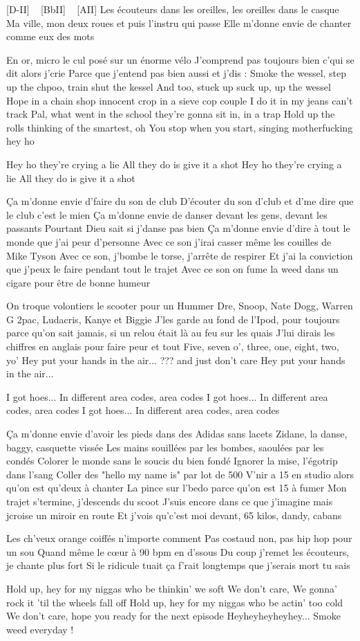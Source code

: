 [D-II] ~ [BbII] ~ [AII]
Les écouteurs dans les oreilles, les oreilles dans le casque
Ma ville, mon deux roues et puis l'instru qui passe
Elle m'donne envie de chanter comme eux des mots

En or, micro le cul posé sur un énorme vélo
J'comprend pas toujours bien c'qui se dit alors j'crie
Parce que j'entend pas bien aussi et j'dis :
Smoke the wessel, step up the chpoo, train shut the kessel
And too, stuck up suck up, up the wessel
Hope in a chain shop innocent crop in a sieve cop couple
I do it in my jeans can't track
Pal, what went in the school they're gonna sit in, in a trap
Hold up the rolls thinking of the smartest, oh
You stop when you start, singing motherfucking hey ho

Hey ho they're crying a lie
All they do is give it a shot
Hey ho they're crying a lie
All they do is give it a shot

Ça m'donne envie d'faire du son de club
D'écouter du son d'club et d'me dire que le club c'est le mien
Ça m'donne envie de danser devant les gens, devant les passants Pourtant Dieu sait si j'danse pas bien
Ça m'donne envie d'dire à tout le monde que j'ai peur d'personne
Avec ce son j'irai casser même les couilles de Mike Tyson
Avec ce son, j'bombe le torse, j'arrête de respirer
Et j'ai la conviction que j'peux le faire pendant tout le trajet
Avec ce son on fume la weed dans un cigare pour être de bonne humeur

On troque volontiers le scooter pour un Hummer
Dre, Snoop, Nate Dogg, Warren G
2pac, Ludacris, Kanye et Biggie
J'les garde au fond de l'Ipod, pour toujours parce qu'on sait jamais, si un relou était là au feu sur les quais
J'lui dirais les chiffres en anglais pour faire peur et tout
Five, seven o', three, one, eight, two, yo'
Hey put your hands in the air...
??? and just don't care
Hey put your hands in the air...


I got hoes...
In different area codes, area codes
I got hoes...
In different area codes, area codes
I got hoes...
In different area codes, area codes

Ça m'donne envie d'avoir les pieds dans des Adidas sans lacets
Zidane, la danse, baggy, casquette vissée
Les mains souillées par les bombes, saoulées par les condés
Colorer le monde sans le soucis du bien fondé
Ignorer la mise, l'égotrip dans l'sang
Coller des "hello my name is" par lot de 500
V'nir a 15 en studio alors qu'on est qu'deux à chanter
La pince sur l'bedo parce qu'on est 15 à fumer
Mon trajet s'termine, j'descends du scoot
J'suis encore dans ce que j'imagine mais jcroise un miroir en route
Et j'vois qu'c'est moi devant, 65 kilos, dandy, cabans

Les ch'veux orange coiffés n'importe comment
Pas costaud non, pas hip hop pour un sou
Quand même le cœur à 90 bpm en d'ssous
Du coup j'remet les écouteurs, je chante plus fort
Si le ridicule tuait ça f'rait longtemps que j'serais mort tu sais

Hold up, hey for my niggas who be thinkin' we soft
We don't care, We gonna' rock it 'til the wheels fall off
Hold up, hey for my niggas who be actin' too cold
We don't care, hope you ready for the next episode
Heyheyheyheyhey... Smoke weed everyday ! 